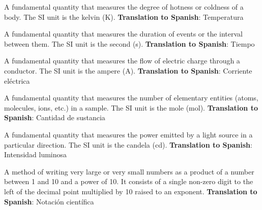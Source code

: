 \begin{vocabulary}[Temperature]
A fundamental quantity that measures the degree of hotness or coldness of a body. The SI unit is the kelvin (K). \newline
\textbf{Translation to Spanish}: Temperatura \newline
\end{vocabulary}

\begin{vocabulary}[Time]
A fundamental quantity that measures the duration of events or the interval between them. The SI unit is the second (s). \newline
\textbf{Translation to Spanish}: Tiempo \newline
\end{vocabulary}

\begin{vocabulary}
A fundamental quantity that measures the flow of electric charge through a conductor. The SI unit is the ampere (A). \newline
\textbf{Translation to Spanish}: Corriente eléctrica \newline
\end{vocabulary}

\begin{vocabulary}
A fundamental quantity that measures the number of elementary entities (atoms, molecules, ions, etc.) in a sample. The SI unit is the mole (mol). \newline
\textbf{Translation to Spanish}: Cantidad de sustancia \newline
\end{vocabulary}

\begin{vocabulary}
A fundamental quantity that measures the power emitted by a light source in a particular direction. The SI unit is the candela (cd). \newline
\textbf{Translation to Spanish}: Intensidad luminosa \newline
\end{vocabulary}

\begin{vocabulary}
A method of writing very large or very small numbers as a product of a number between 1 and 10 and a power of 10. It consists of a single non-zero digit to the left of the decimal point multiplied by 10 raised to an exponent. \newline
\textbf{Translation to Spanish}: Notación científica \newline
\end{vocabulary}

